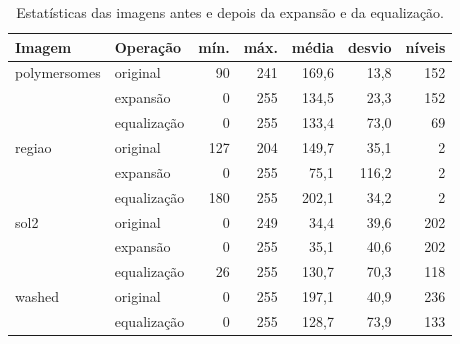 \documentclass[11pt,a4paper]{article}
\begin{document}
\begin{table}[H]
\centering
\small
\begin{tabular}{llrrrrr}
\toprule
\textbf{Imagem} & \textbf{Operação} & \textbf{mín.} & \textbf{máx.} & \textbf{média} & \textbf{desvio} & \textbf{níveis} \\
\midrule
polymersomes & original    & 90  & 241 & 169,6 & 13,8  & 152 \\
             & expansão    & 0   & 255 & 134,5 & 23,3  & 152 \\
             & equalização & 0   & 255 & 133,4 & 73,0  & 69  \\
\midrule
regiao       & original    & 127 & 204 & 149,7 & 35,1  & 2 \\
             & expansão    & 0   & 255 & 75,1  & 116,2 & 2 \\
             & equalização & 180 & 255 & 202,1 & 34,2  & 2 \\
\midrule
sol2         & original    & 0   & 249 & 34,4  & 39,6  & 202 \\
             & expansão    & 0   & 255 & 35,1  & 40,6  & 202 \\
             & equalização & 26  & 255 & 130,7 & 70,3  & 118 \\
\midrule
washed       & original    & 0   & 255 & 197,1 & 40,9  & 236 \\
             & equalização & 0   & 255 & 128,7 & 73,9  & 133 \\
\bottomrule
\end{tabular}
\caption{Estatísticas das imagens antes e depois da expansão e da equalização.}
\label{tab:histograma}
\end{table}
\end{document}
